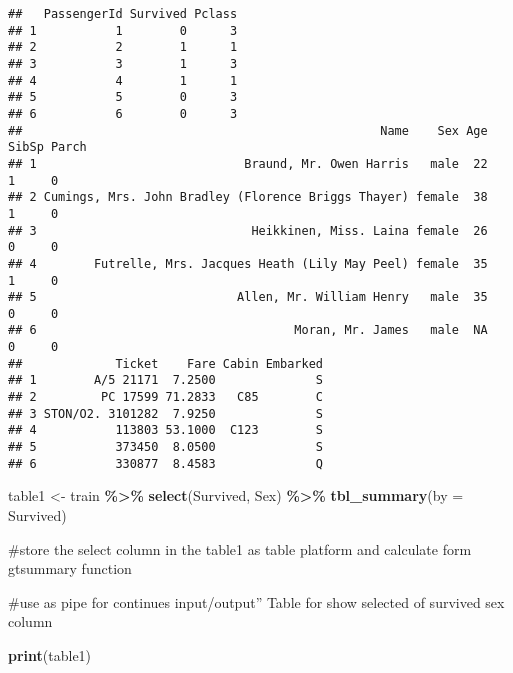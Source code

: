 \documentclass[
]{article}
\newenvironment{Shaded}{\begin{snugshade}}{\end{snugshade}}
\newcommand{\AttributeTok}[1]{\textcolor[rgb]{0.13,0.29,0.53}{#1}}
\newcommand{\FunctionTok}[1]{\textcolor[rgb]{0.13,0.29,0.53}{\textbf{#1}}}
\newcommand{\NormalTok}[1]{#1}
\newcommand{\OtherTok}[1]{\textcolor[rgb]{0.56,0.35,0.01}{#1}}
\newcommand{\SpecialCharTok}[1]{\textcolor[rgb]{0.81,0.36,0.00}{\textbf{#1}}}
\begin{document}
\begin{verbatim}
##   PassengerId Survived Pclass
## 1           1        0      3
## 2           2        1      1
## 3           3        1      3
## 4           4        1      1
## 5           5        0      3
## 6           6        0      3
##                                                  Name    Sex Age SibSp Parch
## 1                             Braund, Mr. Owen Harris   male  22     1     0
## 2 Cumings, Mrs. John Bradley (Florence Briggs Thayer) female  38     1     0
## 3                              Heikkinen, Miss. Laina female  26     0     0
## 4        Futrelle, Mrs. Jacques Heath (Lily May Peel) female  35     1     0
## 5                            Allen, Mr. William Henry   male  35     0     0
## 6                                    Moran, Mr. James   male  NA     0     0
##             Ticket    Fare Cabin Embarked
## 1        A/5 21171  7.2500              S
## 2         PC 17599 71.2833   C85        C
## 3 STON/O2. 3101282  7.9250              S
## 4           113803 53.1000  C123        S
## 5           373450  8.0500              S
## 6           330877  8.4583              Q
\end{verbatim}

\begin{Shaded}
\begin{Highlighting}[]
\NormalTok{table1 }\OtherTok{\textless{}{-}}\NormalTok{ train }\SpecialCharTok{\%\textgreater{}\%}
  \FunctionTok{select}\NormalTok{(Survived, Sex) }\SpecialCharTok{\%\textgreater{}\%}
  \FunctionTok{tbl\_summary}\NormalTok{(}\AttributeTok{by =}\NormalTok{ Survived)}
\end{Highlighting}
\end{Shaded}

\#store the select column in the table1 as table platform and calculate
form gtsummary function

\#use as pipe for continues input/output'' Table for show selected of
survived sex column

\begin{Shaded}
\begin{Highlighting}[]
\FunctionTok{print}\NormalTok{(table1)}
\end{Highlighting}
\end{Shaded}
\end{document}
